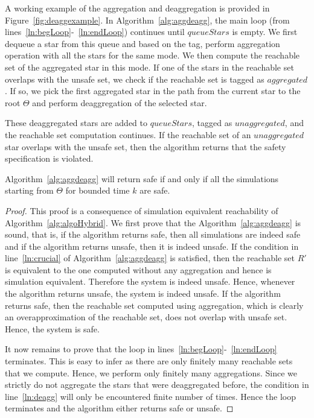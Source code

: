 A working example of the aggregation and deaggregation is provided in Figure~\ref{fig:deaggexample}.
%
In Algorithm~\ref{alg:aggdeagg}, the main loop (from lines~\ref{ln:begLoop}-~\ref{ln:endLoop}) continues until $queueStars$ is empty. 
%
We first dequeue a star from this queue and based on the tag, perform aggregation operation with all the stars for the same mode. 
%
We then compute the reachable set of the aggregated star in this mode. If one of the stars in the reachable set overlaps with the unsafe set, we check if the reachable set is tagged as $aggregated$. 
%
If so, we pick the first aggregated star in the path from the current star to the root $\Theta$ and perform deaggregation of the selected star.

These deaggregated stars are added to $queueStars$, tagged as $unaggregated$, and the reachable set computation continues. 
%
If the reachable set of an $unaggregated$ star overlaps with the unsafe set, then the algorithm returns that the safety specification is violated.



\begin{lemma}
Algorithm~\ref{alg:aggdeagg} will return safe if and only if all the simulations starting from $\Theta$ for bounded time $k$ are safe.
\end{lemma}
\begin{proof}
This proof is a consequence of simulation equivalent reachability of Algorithm~\ref{alg:algoHybrid}. 
%
We first prove that the Algorithm~\ref{alg:aggdeagg} is sound, that is, if the algorithm returns safe, then all simulations are indeed safe and if the algorithm returns unsafe, then it is indeed unsafe. 
%
If the condition in line~\ref{ln:crucial} of Algorithm~\ref{alg:aggdeagg} is satisfied, then the reachable set $R'$ is equivalent to the one computed without any aggregation and hence is simulation equivalent. 
%
Therefore the system is indeed unsafe. 
%
Hence, whenever the algorithm returns unsafe, the system is indeed unsafe. 
%
If the algorithm returns safe, then the reachable set computed using aggregation, which is clearly an overapproximation of the reachable set, does not overlap with unsafe set. 
%
Hence, the system is safe. 


It now remains to prove that the loop in lines~\ref{ln:begLoop}-~\ref{ln:endLoop} terminates. 
%
This is easy to infer as there are only finitely many reachable sets that we compute. 
%
Hence, we perform only finitely many aggregations. 
%
Since we strictly do not aggregate the stars that were deaggregated before, the condition in line~\ref{ln:deagg} will only be encountered finite number of times. 
%
Hence the loop terminates and the algorithm either returns safe or unsafe.
\end{proof}


